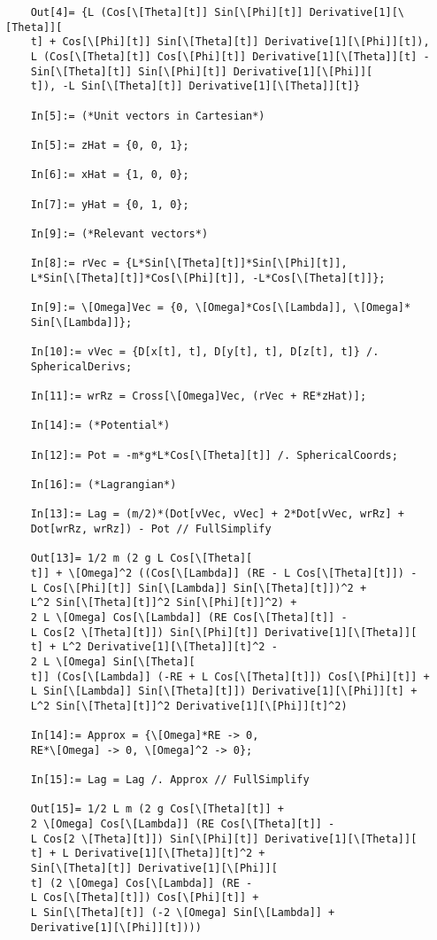 \documentclass{article}
\theoremstyle{definition}
\begin{document}
\begin{enumerate}[label=(\alph*)]
\begin{lstlisting}
	Out[4]= {L (Cos[\[Theta][t]] Sin[\[Phi][t]] Derivative[1][\[Theta]][
	t] + Cos[\[Phi][t]] Sin[\[Theta][t]] Derivative[1][\[Phi]][t]), 
	L (Cos[\[Theta][t]] Cos[\[Phi][t]] Derivative[1][\[Theta]][t] - 
	Sin[\[Theta][t]] Sin[\[Phi][t]] Derivative[1][\[Phi]][
	t]), -L Sin[\[Theta][t]] Derivative[1][\[Theta]][t]}
	
	In[5]:= (*Unit vectors in Cartesian*)
	
	In[5]:= zHat = {0, 0, 1};
	
	In[6]:= xHat = {1, 0, 0};
	
	In[7]:= yHat = {0, 1, 0};
	
	In[9]:= (*Relevant vectors*)
	
	In[8]:= rVec = {L*Sin[\[Theta][t]]*Sin[\[Phi][t]], 
	L*Sin[\[Theta][t]]*Cos[\[Phi][t]], -L*Cos[\[Theta][t]]};
	
	In[9]:= \[Omega]Vec = {0, \[Omega]*Cos[\[Lambda]], \[Omega]*
	Sin[\[Lambda]]};
	
	In[10]:= vVec = {D[x[t], t], D[y[t], t], D[z[t], t]} /. 
	SphericalDerivs;
	
	In[11]:= wrRz = Cross[\[Omega]Vec, (rVec + RE*zHat)];
	
	In[14]:= (*Potential*)
	
	In[12]:= Pot = -m*g*L*Cos[\[Theta][t]] /. SphericalCoords;
	
	In[16]:= (*Lagrangian*)
	
	In[13]:= Lag = (m/2)*(Dot[vVec, vVec] + 2*Dot[vVec, wrRz] + 
	Dot[wrRz, wrRz]) - Pot // FullSimplify
	
	Out[13]= 1/2 m (2 g L Cos[\[Theta][
	t]] + \[Omega]^2 ((Cos[\[Lambda]] (RE - L Cos[\[Theta][t]]) - 
	L Cos[\[Phi][t]] Sin[\[Lambda]] Sin[\[Theta][t]])^2 + 
	L^2 Sin[\[Theta][t]]^2 Sin[\[Phi][t]]^2) + 
	2 L \[Omega] Cos[\[Lambda]] (RE Cos[\[Theta][t]] - 
	L Cos[2 \[Theta][t]]) Sin[\[Phi][t]] Derivative[1][\[Theta]][
	t] + L^2 Derivative[1][\[Theta]][t]^2 - 
	2 L \[Omega] Sin[\[Theta][
	t]] (Cos[\[Lambda]] (-RE + L Cos[\[Theta][t]]) Cos[\[Phi][t]] + 
	L Sin[\[Lambda]] Sin[\[Theta][t]]) Derivative[1][\[Phi]][t] + 
	L^2 Sin[\[Theta][t]]^2 Derivative[1][\[Phi]][t]^2)
	
	In[14]:= Approx = {\[Omega]*RE -> 0, 
	RE*\[Omega] -> 0, \[Omega]^2 -> 0};
	
	In[15]:= Lag = Lag /. Approx // FullSimplify
	
	Out[15]= 1/2 L m (2 g Cos[\[Theta][t]] + 
	2 \[Omega] Cos[\[Lambda]] (RE Cos[\[Theta][t]] - 
	L Cos[2 \[Theta][t]]) Sin[\[Phi][t]] Derivative[1][\[Theta]][
	t] + L Derivative[1][\[Theta]][t]^2 + 
	Sin[\[Theta][t]] Derivative[1][\[Phi]][
	t] (2 \[Omega] Cos[\[Lambda]] (RE - 
	L Cos[\[Theta][t]]) Cos[\[Phi][t]] + 
	L Sin[\[Theta][t]] (-2 \[Omega] Sin[\[Lambda]] + 
	Derivative[1][\[Phi]][t])))
	

\end{lstlisting}
\end{enumerate}
\end{document}
